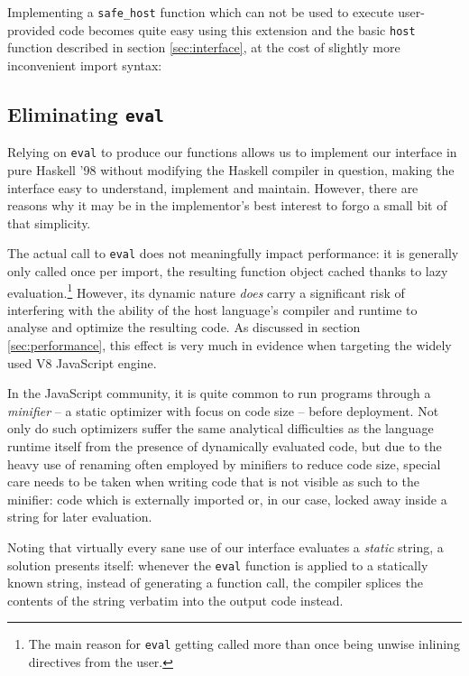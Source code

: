 \documentclass{sigplanconf}
\begin{document}
Implementing a \lstinline!safe_host! function which can not be used
to execute user-provided code becomes quite easy using
this extension and the basic \lstinline!host! function described in section
\ref{sec:interface}, at the cost of slightly more inconvenient import syntax:


\subsection{Eliminating \lstinline!eval!}
\label{sec:inline-eval}
Relying on \lstinline!eval! to produce our functions allows us to
implement our interface in pure Haskell '98 without modifying the Haskell
compiler in question, making the interface easy to understand, implement and
maintain. However, there are reasons why it may be in the implementor's best
interest to forgo a small bit of that simplicity.

The actual call to \lstinline!eval! does not meaningfully impact
performance: it is generally only called once per import,
the resulting function object cached thanks to lazy evaluation.\footnote{
  The main reason for \lstinline!eval! getting called more than once
  being unwise inlining directives from the user.
}
However, its dynamic nature \emph{does}
carry a significant risk of interfering with the ability of the host language's
compiler and runtime to analyse and optimize the resulting code.
As discussed in section \ref{sec:performance}, this effect is very much in
evidence when targeting the widely used V8 JavaScript engine.

In the JavaScript community, it is quite common to run programs through a
\emph{minifier} -- a static optimizer with focus on code size -- before
deployment. Not only do such optimizers suffer the same analytical
difficulties as the language runtime itself from the presence of dynamically
evaluated code, but due to the heavy use of
renaming often employed by minifiers to reduce code size, special care needs
to be taken when writing code that is not visible as such to the minifier:
code which is externally imported or, in our case, locked away inside a string
for later evaluation.

Noting that virtually every sane use of our interface evaluates a \emph{static}
string, a solution presents itself: whenever the \lstinline!eval! function
is applied to a statically known string, instead of generating a function call,
the compiler splices the contents of the string verbatim into the output code
instead.
\end{document}
